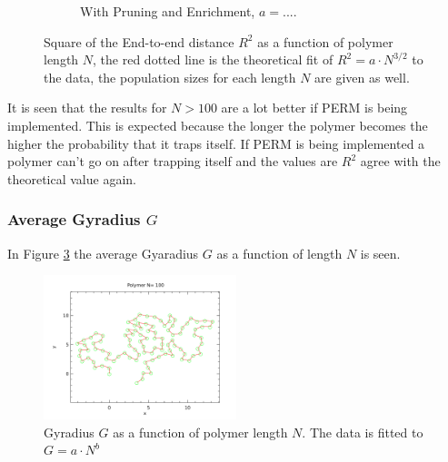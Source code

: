 \begin{figure}[htb]
\begin{subfigure}[b]{0.45\textwidth}
                \caption{With Pruning and Enrichment, $a= ...$.}
                \label{fig:etoe_prem}
        \end{subfigure}
        \caption{Square of the End-to-end distance $R^2$ as a function of polymer length $N$, the red dotted line is the theoretical fit of $R^2=a\cdot N^{3/2}$ to the data, the population sizes for each length $N$ are given as well.}
        \label{fig:etoe}
\end{figure}

It is seen that the results for $N>100$ are a lot better if PERM is being implemented. This is expected because the longer the polymer becomes the higher the probability that it traps itself. If PERM is being implemented a polymer can't go on after trapping itself and the values are $R^2$ agree with the theoretical value again. 


\subsubsection*{Average Gyradius $G$}

In Figure \ref{fig:gyradius} the average Gyaradius $G$ as a function of length $N$ is seen.


\begin{figure}[ht!]
\centering
\includegraphics[width=0.5\textwidth]{voorblad.pdf}
\caption{Gyradius $G$ as a function of polymer length $N$. The data is fitted to $G=a\cdot N^b$}
\label{fig:gyradius}
\end{figure}